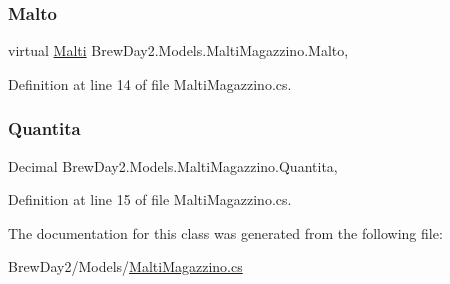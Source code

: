 \mbox{\label{class_brew_day2_1_1_models_1_1_malti_magazzino_aac03b4ea04e251af7a4d339397028953}} 
\subsubsection{\texorpdfstring{Malto}{Malto}}
{\footnotesize\ttfamily virtual \mbox{\hyperlink{class_brew_day2_1_1_models_1_1_malti}{Malti}} Brew\+Day2.\+Models.\+Malti\+Magazzino.\+Malto\hspace{0.3cm}{\ttfamily [get]}, {\ttfamily [set]}}



Definition at line 14 of file Malti\+Magazzino.\+cs.

\mbox{\label{class_brew_day2_1_1_models_1_1_malti_magazzino_afa1b9aa1aba7024ce7c719e74dd12b7a}} 
\subsubsection{\texorpdfstring{Quantita}{Quantita}}
{\footnotesize\ttfamily Decimal Brew\+Day2.\+Models.\+Malti\+Magazzino.\+Quantita\hspace{0.3cm}{\ttfamily [get]}, {\ttfamily [set]}}



Definition at line 15 of file Malti\+Magazzino.\+cs.



The documentation for this class was generated from the following file\+:\begin{DoxyCompactItemize}
\item 
Brew\+Day2/\+Models/\mbox{\hyperlink{_malti_magazzino_8cs}{Malti\+Magazzino.\+cs}}\end{DoxyCompactItemize}
